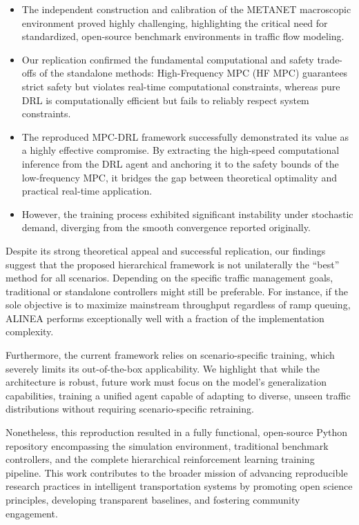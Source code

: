 \begin{itemize}
    \item The independent construction and calibration of the METANET macroscopic environment proved highly challenging, highlighting the critical need for standardized, open-source benchmark environments in traffic flow modeling.
    \item Our replication confirmed the fundamental computational and safety trade-offs of the standalone methods: High-Frequency MPC (HF MPC) guarantees strict safety but violates real-time computational constraints, whereas pure DRL is computationally efficient but fails to reliably respect system constraints.
    \item The reproduced MPC-DRL framework successfully demonstrated its value as a highly effective compromise. By extracting the high-speed computational inference from the DRL agent and anchoring it to the safety bounds of the low-frequency MPC, it bridges the gap between theoretical optimality and practical real-time application.
    \item However, the training process exhibited significant instability under stochastic demand, diverging from the smooth convergence reported originally.
\end{itemize}

Despite its strong theoretical appeal and successful replication, our findings suggest that the proposed hierarchical framework is not unilaterally the ``best'' method for all scenarios. Depending on the specific traffic management goals, traditional or standalone controllers might still be preferable. For instance, if the sole objective is to maximize mainstream throughput regardless of ramp queuing, ALINEA performs exceptionally well with a fraction of the implementation complexity. 

Furthermore, the current framework relies on scenario-specific training, which severely limits its out-of-the-box applicability. We highlight that while the architecture is robust, future work must focus on the model's generalization capabilities, training a unified agent capable of adapting to diverse, unseen traffic distributions without requiring scenario-specific retraining.

Nonetheless, this reproduction resulted in a fully functional, open-source Python repository encompassing the simulation environment, traditional benchmark controllers, and the complete hierarchical reinforcement learning training pipeline. This work contributes to the broader mission of advancing reproducible research practices in intelligent transportation systems by promoting open science principles, developing transparent baselines, and fostering community engagement.

\newpage